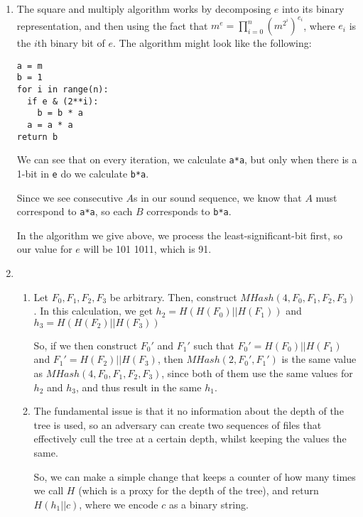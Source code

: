 \documentclass[12pt]{article}
\begin{document}
\begin{enumerate}[label=(\alph*)]
  \item
    The square and multiply algorithm works by decomposing $e$ into its binary representation, and then using the fact that $m^e = \prod_{i=0}^n (m^{2^i})^{e_i}$, where $e_i$ is the $i$th binary bit of $e$. The algorithm might look like the following:

\begin{verbatim}
a = m
b = 1
for i in range(n):
  if e & (2**i):
    b = b * a
  a = a * a
return b
\end{verbatim}

We can see that on every iteration, we calculate \texttt{a*a}, but only when there is a 1-bit in \texttt{e} do we calculate \texttt{b*a}.

Since we see consecutive $A$s in our sound sequence, we know that $A$ must correspond to \texttt{a*a}, so each $B$ corresponds to \texttt{b*a}.

In the algorithm we give above, we process the least-significant-bit first, so our value for $e$ will be 101 1011, which is 91.

\item
  \begin{enumerate}[label=(\roman*)]
    \item
      Let $F_0, F_1, F_2, F_3$ be arbitrary. Then, construct $MHash(4, F_0, F_1, F_2, F_3)$. In this calculation, we get $h_2 = H(H(F_0)||H(F_1))$ and $h_3 = H(H(F_2)||H(F_3))$

      So, if we then construct $F_0'$ and $F_1'$ such that $F_0' = H(F_0)||H(F_1)$ and $F_1' = H(F_2)||H(F_3)$, then $MHash(2, F_0', F_1')$ is the same value as $MHash(4, F_0, F_1, F_2, F_3)$, since both of them use the same values for $h_2$ and $h_3$, and thus result in the same $h_1$.

    \item
      The fundamental issue is that it no information about the depth of the tree is used, so an adversary can create two sequences of files that effectively cull the tree at a certain depth, whilst keeping the values the same.

      So, we can make a simple change that keeps a counter of how many times we call $H$ (which is a proxy for the depth of the tree), and return $H(h_1||c)$, where we encode $c$ as a binary string. 
  \end{enumerate}



\end{enumerate}
\end{document}
